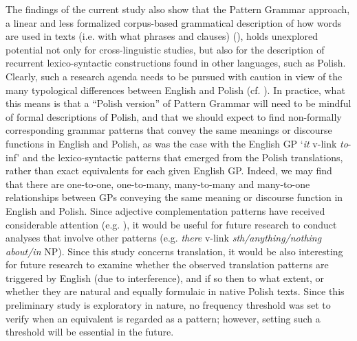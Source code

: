 \documentclass[output=paper]{langscibook}
\begin{document}
The findings of the current study also show that the Pattern Grammar approach, a linear and less formalized corpus-based grammatical description of how words are used in texts (i.e. with what phrases and clauses) (\citealt{HunstonFrancis2000}), holds unexplored potential not only for cross-linguistic studies, but also for the description of recurrent lexico-syntactic constructions found in other languages, such as Polish. Clearly, such a research agenda needs to be pursued with caution in view of the many typological differences between English and Polish (cf. \citealt{FisiakEtAl1978, WillimMańczak-Wohlfeld1997}). In practice, what this means is that a “Polish version” of Pattern Grammar will need to be mindful of formal descriptions of Polish, and that we should expect to find non-formally corresponding grammar patterns that convey the same meanings or discourse functions in English and Polish, as was the case with the English GP ‘\textit{it} v-link {\ADJ} \textit{to}{}-inf’ and the lexico-syntactic patterns that emerged from the Polish translations, rather than exact equivalents for each given English GP. Indeed, we may find that there are one-to-one, one-to-many, many-to-many and many-to-one relationships between GPs conveying the same meaning or discourse function in English and Polish. Since adjective complementation patterns have received considerable attention (e.g. \citealt{SuHunston2019}), it would be useful for future research to conduct analyses that involve other patterns (e.g. \textit{there} v-link \textit{sth/anything/nothing} {\ADJ} \textit{about/in} NP). Since this study concerns translation, it would be also interesting for future research to examine whether the observed translation patterns are triggered by English (due to interference), and if so then to what extent, or whether they are natural and equally formulaic in native Polish texts. Since this preliminary study is exploratory in nature, no frequency threshold was set to verify when an equivalent is regarded as a pattern; however, setting such a threshold will be essential in the future. 
\end{document}
